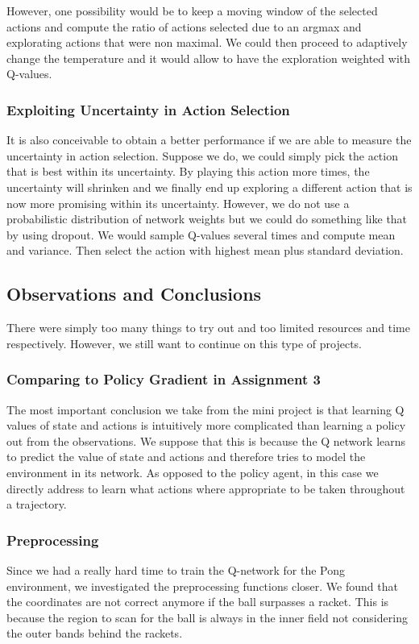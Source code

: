 \documentclass[10pt,a4paper]{article}
\begin{document}
However, one possibility would be to keep a moving window of the selected actions and compute the ratio of actions selected due to an argmax and explorating actions that were non maximal. We could then proceed to adaptively change the temperature and it would allow to have the exploration weighted with Q-values.

\subsubsection{Exploiting Uncertainty in Action Selection}
It is also conceivable to obtain a better performance if we are able to measure the uncertainty in action selection. Suppose we do, we could simply pick the action that is best within its uncertainty. By playing this action more times, the uncertainty will shrinken and we finally end up exploring a different action that is now more promising within its uncertainty. However, we do not use a probabilistic distribution of network weights but we could do something like that by using dropout. We would sample Q-values several times and compute mean and variance. Then select the action with highest mean plus standard deviation.

\subsection{Observations and Conclusions}
There were simply too many things to try out and too limited resources and time respectively. However, we still want to continue on this type of projects.

\subsubsection{Comparing to Policy Gradient in Assignment 3}
The most important conclusion we take from the mini project is that learning Q values of state and actions is intuitively more complicated than learning a policy out from the observations. We suppose that this is because the Q network learns to predict the value of state and actions and therefore tries to model the environment in its network. As opposed to the policy agent, in this case we directly address to learn what actions where appropriate to be taken throughout a trajectory.

\subsubsection{Preprocessing}
Since we had a really hard time to train the Q-network for the Pong environment, we investigated the preprocessing functions closer. We found that the coordinates are not correct anymore if the ball surpasses a racket. This is because the region to scan for the ball is always in the inner field not considering the outer bands behind the rackets.
\end{document}
